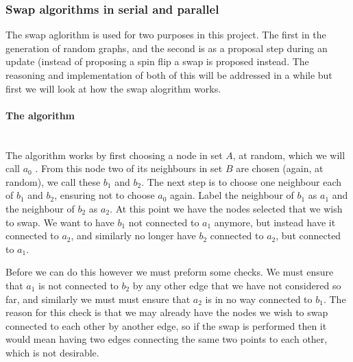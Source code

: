 \documentclass[pdftex,12pt,a4paper]{article}
\begin{document}
\subsubsection{Swap algorithms in serial and parallel}

The swap aglorithm is used for two purposes in this project. The first in the generation of random graphs, and the second is as a proposal step during an update (instead of proposing a spin flip a swap is proposed instead. The reasoning and implementation of both of this will be addressed in a while but first we will look at how the swap alogrithm works.

\paragraph{The algorithm} ~\\

The algorithm works by first choosing a node in set $A$, at random, which we will call $a_0$ . From this node two of its neighbours in set $B$ are chosen (again, at random), we call these $b_1$ and $b_2$. The next step is to choose one neighbour each of $b_1$ and $b_2$, ensuring not to choose $a_0$ again. Label the neighbour of $b_1$ as $a_1$ and the neighbour of $b_2$ as $a_2$. At this point we have the nodes selected that we wish to swap. We want to have $b_1$ not connected to $a_1$ anymore, but instead have it connected to $a_2$, and similarly no longer have $b_2$ connected to $a_2$, but connected to $a_1$.

Before we can do this however we must preform some checks. We must ensure that $a_1$ is not connected to $b_2$ by any other edge that we have not considered so far, and similarly we must must ensure that $a_2$ is in no way connected to $b_1$. The reason for this check is that we may already have the nodes we wish to swap connected to each other by another edge, so if the swap is performed then it would mean having two edges connecting the same two points to each other, which is not desirable.
\end{document}
